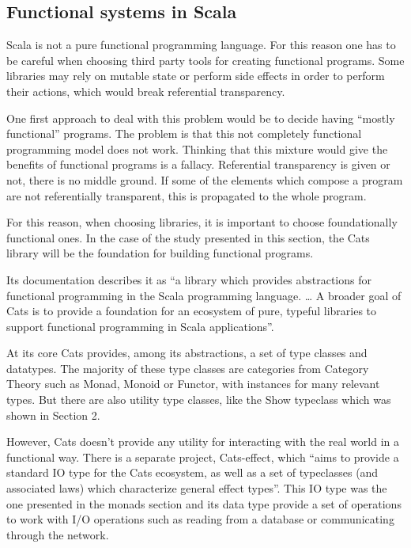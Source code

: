 \documentclass[../main.tex]{subfiles}
\begin{document}
\subsection{Functional systems in Scala}
Scala is not a pure functional programming language. For this reason one has to
be careful when choosing third party tools for creating functional programs.
Some libraries may rely on mutable state or perform side effects in order to
perform their actions, which would break referential transparency.

One first approach to deal with this problem would be to decide having ``mostly
functional'' programs. The problem is that this not completely functional
programming model does not work\autocite{MeijerTheWork}. Thinking that
this mixture would give the benefits of functional programs is a
fallacy. Referential transparency is given or not, there is no middle ground. If
some of the elements which compose a program are not referentially transparent,
this is propagated to the whole program.

For this reason, when choosing libraries, it is important to choose foundationally
functional ones. In the case of the study presented in this section, the Cats library
\autocite{Cats:Home} will be the foundation for building functional programs.

Its documentation describes it as ``a library which provides abstractions for
functional programming in the Scala programming language. \ldots \: A broader goal of
Cats is to provide a foundation for an ecosystem of pure, typeful libraries to
support functional programming in Scala applications''.

At its core Cats provides, among its abstractions, a set of type classes and
datatypes. The majority of these type classes are categories from Category Theory
such as Monad, Monoid or Functor, with instances for many relevant types. But
there are also utility type classes, like the Show typeclass which was shown in
Section 2.

However, Cats doesn't provide any utility for interacting with the real world in
a functional way. There is a separate project, Cats-effect, \autocite{CatsHome}
which ``aims to
provide a standard IO type for the Cats ecosystem, as well as a set
of typeclasses (and associated laws) which characterize general effect types''.
This IO type was the one presented in the monads section and its data type
provide a set of operations to work with I/O operations such as reading from a
database or communicating through the network.
\end{document}
